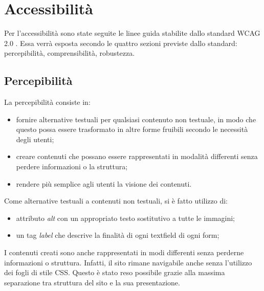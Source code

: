 	\section{Accessibilità}
	Per l'accessibilità sono state seguite le linee guida stabilite dallo standard WCAG 2.0 . Essa verrà esposta secondo le quattro sezioni previste dallo standard: percepibilità, comprensibilità, robustezza.
	\subsection{Percepibilità}
	La percepibilità consiste in: 
	\begin{itemize}
		\item fornire alternative testuali per qualsiasi contenuto non testuale, in modo che questo possa essere trasformato in altre forme fruibili secondo le necessità degli utenti;
		\item creare contenuti che possano essere rappresentati in modalità differenti senza perdere informazioni o la struttura;
		\item rendere più semplice agli utenti la visione dei contenuti.
	\end{itemize}
	Come alternative testuali a contenuti non testuali, si è fatto utilizzo di:
	\begin{itemize}
		\item attributo \textit{alt} con un appropriato testo sostitutivo a tutte le immagini;
		\item un tag \textit{label} che descrive la finalità di ogni textfield di ogni form;
	\end{itemize}
	I contenuti creati sono anche rappresentati in modi differenti senza perderne informazioni o struttura. Infatti, il sito rimane navigabile anche senza l'utilizzo dei fogli di stile CSS. Questo è stato reso possibile grazie alla massima separazione tra struttura del sito e la sua presentazione.
